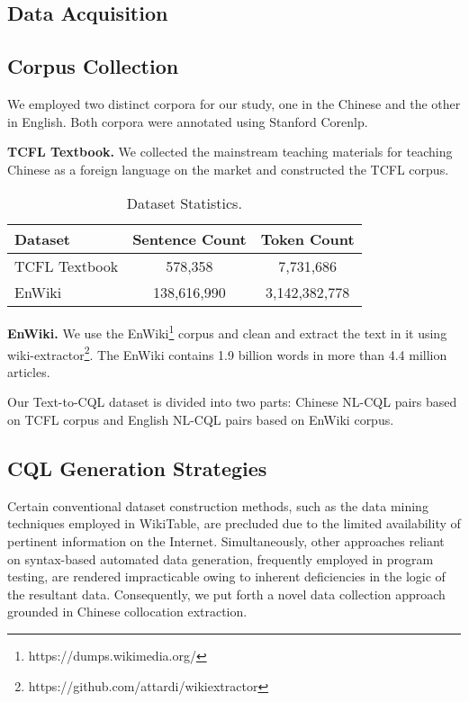 \documentclass[11pt]{article}
\begin{document}
\begin{CJK*}{UTF8}{gbsn}
\section{Data Acquisition }
\subsection{Corpus Collection}
We employed two distinct corpora for our study, one in the Chinese and the other in English. Both corpora were annotated using Stanford Corenlp.

\textbf{TCFL Textbook.} We collected the mainstream teaching materials for teaching Chinese as a foreign language on the market and constructed the TCFL corpus.


\begin{table}[h!]
\centering
\begin{tabular}{lcc}
\toprule
\textbf{Dataset} & \textbf{Sentence Count} & \textbf{Token Count}\\
\midrule
TCFL Textbook & 578,358 & 7,731,686  \\
EnWiki & 138,616,990 & 3,142,382,778  \\
\bottomrule
\end{tabular}
\caption{Dataset Statistics.}
\label{tab:corpusScale}
\end{table}



\textbf{EnWiki.} We use the EnWiki\citep{enwiki}\footnote{ https://dumps.wikimedia.org/} corpus and clean and extract the text in it using wiki-extractor\footnote{https://github.com/attardi/wikiextractor}\citep{Wikiextractor2015}. The EnWiki contains 1.9 billion words in more than 4.4 million articles.

Our Text-to-CQL dataset is divided into two parts: Chinese NL-CQL pairs based on TCFL corpus and English NL-CQL pairs based on EnWiki corpus.
\subsection{CQL Generation Strategies}

Certain conventional dataset construction methods, such as the data mining techniques employed in WikiTable\citep{wikitable}, are precluded due to the limited availability of pertinent information on the Internet. Simultaneously, other approaches reliant on syntax-based automated data generation, frequently employed in program testing, are rendered impracticable owing to inherent deficiencies in the logic of the resultant data. Consequently, we put forth a novel data collection approach grounded in Chinese collocation extraction.


\end{CJK*}
\end{document}
